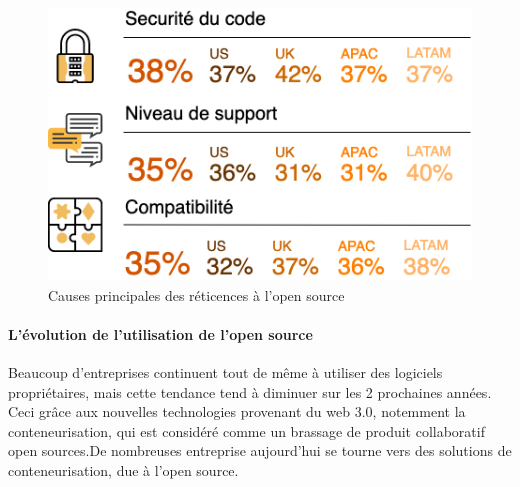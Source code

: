 					\begin{figure}[h]
						\center
						\includegraphics[scale=0.75]{./img/Barreer_os.png}
						\caption{Causes principales des réticences à l'open source}					
					\end{figure}
					\clearpage

				\paragraph{L'évolution de l'utilisation de l'open source\\}

					Beaucoup d'entreprises continuent tout de même à utiliser des logiciels propriétaires, mais cette tendance tend à diminuer sur les 2 prochaines années. Ceci grâce aux nouvelles technologies provenant du \gls{web 3.0}, notemment la \gls{conteneurisation}, qui est considéré comme un brassage de produit collaboratif open sources.De nombreuses entreprise aujourd'hui se tourne vers des solutions de conteneurisation, due à l'open source.
					

